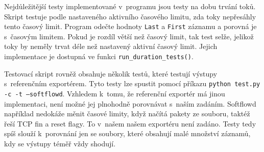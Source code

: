 \documentclass[a4paper, 11pt]{article}
\begin{document}
\begin{sloppypar}
\begin{lstlisting}[language=json, caption={Ukázka logu z~kolektoru ze~souboru \texttt{tests/logs/myOyt\_test3.json}}, label={lst1}]
\end{lstlisting}

Nejdůležitější testy implementované v~programu jsou testy na dobu trvání toků. Skript testuje podle nastaveného aktivního časového limitu, zda toky nepřesáhly tento časový limit. Program odečte hodnoty \texttt{Last} a \texttt{First} záznamu a porovná je s~časovým limitem. Pokud je rozdíl větší než časový limit, tak test selže, jelikož toky by neměly trvat déle než nastavený aktivní časový limit. Jejich implementace je dostupná ve funkci \texttt{run\_duration\_tests()}.

Testovací skript rovněž obsahuje několik testů, které testují výstupy s~referenčním exportérem. Tyto testy lze spustit pomocí příkazu \texttt{python test.py -c -t --softflowd}. Vzhledem k~tomu, že referenční exportér má jinou implementaci, není možné jej plnohodně porovnávat s~naším zadáním. Softflowd například nedokáže měnit časové limity, když načítá pakety ze souboru, taktéž řeší TCP fin a reset flagy. To v~našem našem exportéru není zadáno. Testy tedy spíš slouží k~porovnání jen se soubory, které obsahují malé množství záznamů, kdy se výstupy téměř vždy shodují.
\newpage



\end{sloppypar}
\end{document}
